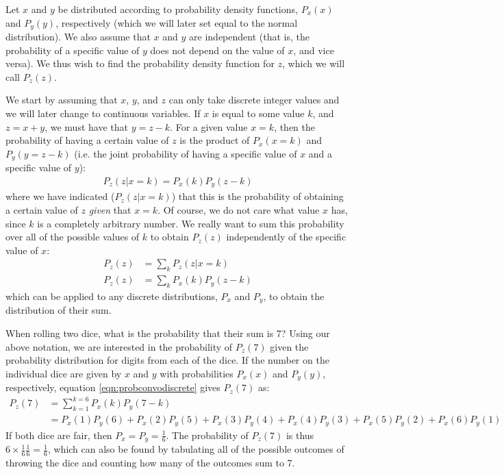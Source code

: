 Let $x$ and $y$ be distributed according to probability density functions, $P_x(x)$ and $P_y(y)$, respectively (which we will later set equal to the normal distribution). We also assume that $x$ and $y$ are independent (that is, the probability of a specific value of $y$ does not depend on the value of $x$, and vice versa). We thus wish to find the probability density function for $z$, which we will call $P_z(z)$.

We start by assuming that $x$, $y$, and $z$ can only take discrete integer values and we will later change to continuous variables. If $x$ is equal to some value $k$, and $z=x+y$, we must have that $y=z-k$. For a given value $x=k$, then the probability of having a certain value of $z$ is the product of $P_x(x=k)$ and $P_y(y=z-k)$ (i.e. the joint probability of having a specific value of $x$ and a specific value of $y$):
\begin{align*}
P_z(z|x=k)=P_x(k)P_y(z-k)
\end{align*} 
where we have indicated ($P_z(z|x=k)$) that this is the probability of obtaining a certain value of $z$ \textit{given} that $x=k$. Of course, we do not care what value $x$ has, since $k$ is a completely arbitrary number. We really want to sum this probability over all of the possible values of $k$ to obtain $P_z(z)$ independently of the specific value of $x$:
\begin{align}
\label{eqn:probconvodiscrete}
P_z(z)&=\sum_kP_z(z|x=k)\nonumber\\
P_z(z)&=\sum_kP_x(k)P_y(z-k)
\end{align}
which can be applied to any discrete distributions, $P_x$ and $P_y$, to obtain the distribution of their sum. 
\begin{example}{When rolling two dice, what is the probability that their sum is 7?}
Using our above notation, we are interested in the probability of $P_z(7)$ given the probability distribution for digits from each of the dice. If the number on the individual dice are given by $x$ and $y$ with probabilities $P_x(x)$ and $P_y(y)$, respectively, equation \ref{eqn:probconvodiscrete} gives $P_z(7)$ as:
\begin{align*}
P_z(7)&=\sum_{k=1}^{k=6} P_x(k)P_y(7-k)\\
 &=P_x(1)P_y(6)+P_x(2)P_y(5)+P_x(3)P_y(4)+P_x(4)P_y(3)+P_x(5)P_y(2)+P_x(6)P_y(1)
\end{align*} 
If both dice are fair, then $P_x=P_y=\frac{1}{6}$. The probability of $P_z(7)$ is thus $6\times\frac{1}{6}\frac{1}{6}=\frac{1}{6}$, which can also be found by tabulating all of the possible outcomes of throwing the dice and counting how many of the outcomes sum to 7. 
\end{example}

